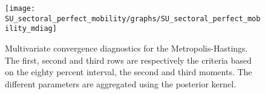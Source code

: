  
\begin{figure}[H]
\centering 
\texttt{[image: SU\_sectoral\_perfect\_mobility/graphs/SU\_sectoral\_perfect\_mobility\_mdiag]}
\caption{Multivariate convergence diagnostics for the Metropolis-Hastings.
The first, second and third rows are respectively the criteria based on
the eighty percent interval, the second and third moments. The different 
parameters are aggregated using the posterior kernel.}\label{Fig:MultivariateDiagnostics}
\end{figure}

